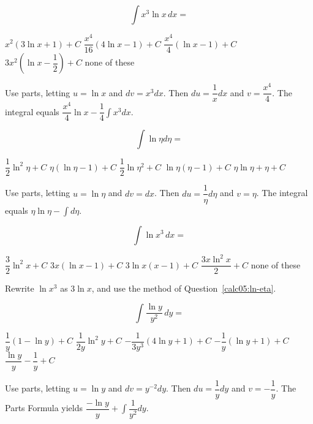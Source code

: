 \newpage


\question
\[
\displaystyle\int x^{3} \ln x \,dx=
\]
\begin{choices}
  \choice $x^{2}(3 \ln x+1)+C$
  \CorrectChoice $\dfrac{x^{4}}{16}(4 \ln x-1)+C$
  \choice $\dfrac{x^{4}}{4}(\ln x-1)+C$
  \choice $3 x^{2}\left(\ln x-\dfrac{1}{2}\right)+C$
  \choice none of these
\end{choices}
\begin{solution}
Use parts, letting $u=\ln x$ and $d v=x^{3} d x$. Then $d u=\dfrac{1}{x} d x$ and $v=\dfrac{x^{4}}{4}$. The integral equals $\dfrac{x^{4}}{4} \ln x-\dfrac{1}{4} \displaystyle\int x^{3} d x$.
\end{solution}

\question\label{calc05:ln-eta}
\[
\displaystyle\int \ln \eta d \eta=
\]
\begin{choices}
  \choice $\dfrac{1}{2} \ln ^{2} \eta+C$
  \CorrectChoice $\eta(\ln \eta-1)+C$
  \choice $\dfrac{1}{2} \ln \eta^{2}+C$
  \choice $\ln \eta(\eta-1)+C$
  \choice $\eta \ln \eta+\eta+C$
\end{choices}
\begin{solution}
Use parts, letting $u=\ln \eta$ and $d v=d x$. Then $d u=\dfrac{1}{\eta} d \eta$ and $v=\eta$. The integral equals $\eta \ln \eta-\displaystyle\int d \eta$.
\end{solution}

\question
\[
\displaystyle\int \ln x^{3} \,dx=
\]
\begin{choices}
  \choice $\dfrac{3}{2} \ln ^{2} x+C$
  \CorrectChoice $3 x(\ln x-1)+C$
  \choice $3 \ln x(x-1)+C$
  \choice $\dfrac{3 x \ln ^{2} x}{2}+C$
  \choice none of these
\end{choices}
\begin{solution}
Rewrite $\ln x^{3}$ as $3 \ln x$, and use the method of Question~\ref{calc05:ln-eta}.
\end{solution}



\newpage


\question
\[
\displaystyle\int \dfrac{\ln y}{y^{2}} \,dy=
\]
\begin{choices}
  \choice $\dfrac{1}{y}(1-\ln y)+C$
  \choice $\dfrac{1}{2 y} \ln ^{2} y+C$
  \choice $-\dfrac{1}{3 y^{3}}(4 \ln y+1)+C$
  \CorrectChoice $-\dfrac{1}{y}(\ln y+1)+C$
  \choice $\dfrac{\ln y}{y}-\dfrac{1}{y}+C$
\end{choices}
\begin{solution}
Use parts, letting $u=\ln y$ and $d v=y^{-2} d y$. Then $d u=\dfrac{1}{y} d y$ and $v=-\dfrac{1}{y}$. The Parts Formula yields $\dfrac{-\ln y}{y}+\displaystyle\int \dfrac{1}{y^{2}} d y$.
\end{solution}

